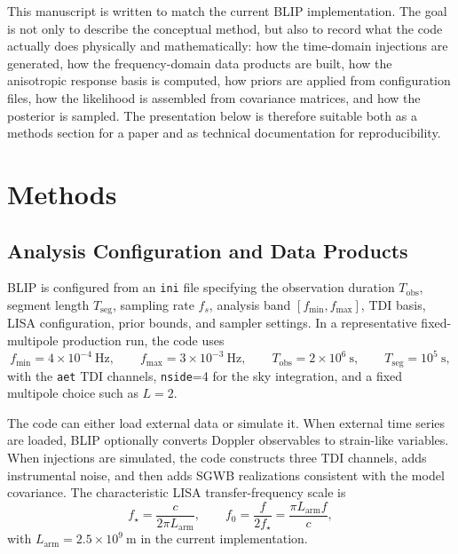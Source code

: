 \documentclass[11pt]{article}
\begin{document}
This manuscript is written to match the current BLIP implementation. The goal is not only to describe the conceptual method, but also to record what the code actually does physically and mathematically: how the time-domain injections are generated, how the frequency-domain data products are built, how the anisotropic response basis is computed, how priors are applied from configuration files, how the likelihood is assembled from covariance matrices, and how the posterior is sampled. The presentation below is therefore suitable both as a methods section for a paper and as technical documentation for reproducibility.

\section{Methods}
\subsection{Analysis Configuration and Data Products}
BLIP is configured from an \texttt{ini} file specifying the observation duration $T_{\mathrm{obs}}$, segment length $T_{\mathrm{seg}}$, sampling rate $f_s$, analysis band $[f_{\min},f_{\max}]$, TDI basis, LISA configuration, prior bounds, and sampler settings. In a representative fixed-multipole production run, the code uses
\begin{equation}
f_{\min}=4\times10^{-4}\ \mathrm{Hz}, \qquad
f_{\max}=3\times10^{-3}\ \mathrm{Hz}, \qquad
T_{\mathrm{obs}}=2\times10^{6}\ \mathrm{s}, \qquad
T_{\mathrm{seg}}=10^{5}\ \mathrm{s},
\end{equation}
with the \texttt{aet} TDI channels, \texttt{nside}=4 for the sky integration, and a fixed multipole choice such as $L=2$.

The code can either load external data or simulate it. When external time series are loaded, BLIP optionally converts Doppler observables to strain-like variables. When injections are simulated, the code constructs three TDI channels, adds instrumental noise, and then adds SGWB realizations consistent with the model covariance. The characteristic LISA transfer-frequency scale is
\begin{equation}
f_{\star}=\frac{c}{2\pi L_{\mathrm{arm}}},
\qquad
f_0=\frac{f}{2f_{\star}}=\frac{\pi L_{\mathrm{arm}} f}{c},
\end{equation}
with $L_{\mathrm{arm}}=2.5\times10^9\ \mathrm{m}$ in the current implementation.
\end{document}
